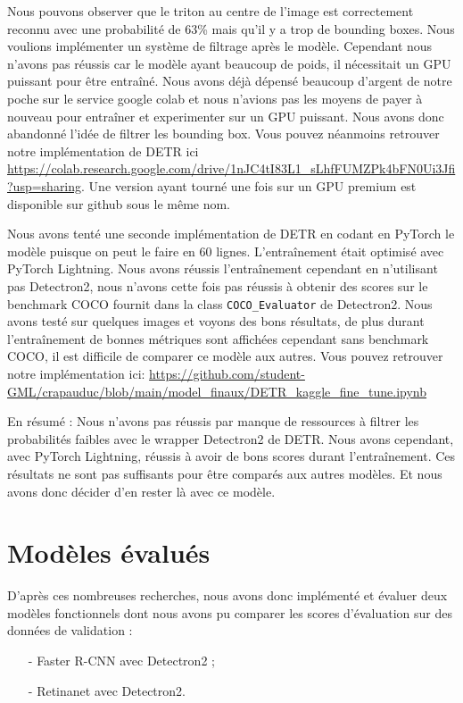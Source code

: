 Nous pouvons observer que le triton au centre de l'image est correctement reconnu avec une probabilité de 63\% mais qu'il y a trop de bounding boxes. Nous voulions implémenter un système de filtrage après le modèle. Cependant nous n'avons pas réussis car le modèle ayant beaucoup de poids, il nécessitait un GPU puissant pour être entraîné. Nous avons déjà dépensé beaucoup d'argent de notre poche sur le service google colab et nous n'avions pas les moyens de payer à nouveau pour entraîner et experimenter sur un GPU puissant. Nous avons donc abandonné l'idée de filtrer les bounding box. Vous pouvez néanmoins retrouver notre implémentation de DETR ici \url{https://colab.research.google.com/drive/1nJC4tI83L1_sLhfFUMZPk4bFN0Ui3Jfi?usp=sharing}. Une version ayant tourné une fois sur un GPU premium est disponible sur github sous le même nom.

Nous avons tenté une seconde implémentation de DETR en codant en PyTorch le modèle puisque on peut le faire en 60 lignes. L'entraînement était optimisé avec PyTorch Lightning. Nous avons réussis l'entraînement cependant en n'utilisant pas Detectron2, nous n'avons cette fois pas réussis à obtenir des scores sur le benchmark COCO fournit dans la class \verb|COCO_Evaluator| de Detectron2. Nous avons testé sur quelques images et voyons des bons résultats, de plus durant l'entraînement de bonnes métriques sont affichées cependant sans benchmark COCO, il est difficile de comparer ce modèle aux autres. Vous pouvez retrouver notre implémentation ici: \url{https://github.com/student-GML/crapauduc/blob/main/model_finaux/DETR_kaggle_fine_tune.ipynb}

En résumé : Nous n'avons pas réussis par manque de ressources à filtrer les probabilités faibles avec le wrapper Detectron2 de DETR. Nous avons cependant, avec PyTorch Lightning, réussis à avoir de bons scores durant l'entraînement. Ces résultats ne sont pas suffisants pour être comparés aux autres modèles. Et nous avons donc décider d'en rester là avec ce modèle.

\section{Modèles évalués}
D'après ces nombreuses recherches, nous avons donc implémenté et évaluer deux modèles fonctionnels dont nous avons pu comparer les scores d'évaluation sur des données de validation : 

\begin{itemize}
    \item[-] Faster R-CNN avec Detectron2 ;
    \item[-] Retinanet avec Detectron2.
\end{itemize}